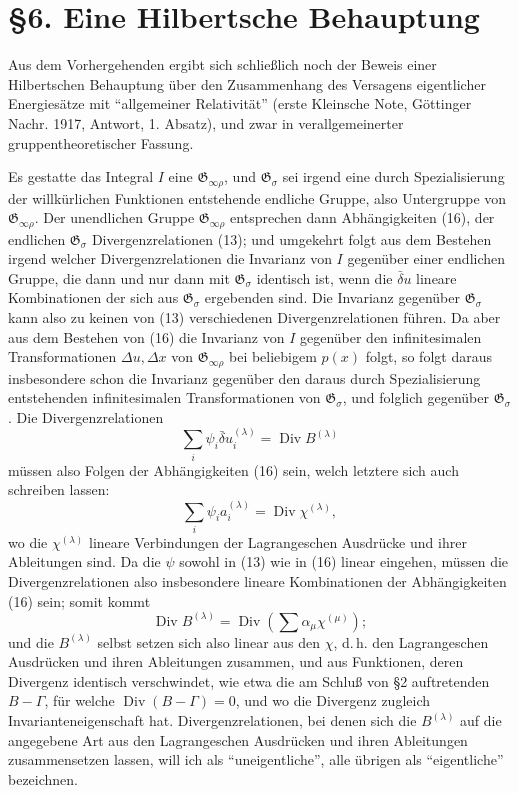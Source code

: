 \documentclass[11pt]{article}
\newcommand{\D}{\Delta}
\providecommand{\Div}{\operatorname{Div}}
\providecommand{\G}{\mathfrak G}
\providecommand{\bd}{\bar{\delta}}
\begin{document}
\section*{\S{}6. Eine Hilbertsche Behauptung}

Aus dem Vorhergehenden ergibt sich schließlich noch der Beweis einer Hilbertschen Behauptung über den Zusammenhang des Versagens eigentlicher Energiesätze mit ``allgemeiner Relativität'' (erste Kleinsche Note, Göttinger Nachr. 1917, Antwort, 1. Absatz), und zwar in verallgemeinerter gruppentheoretischer Fassung.

Es gestatte das Integral \(I\) eine \(\G_{\infty\rho}\), und \(\G_\sigma\) sei irgend eine durch Spezialisierung der willkürlichen Funktionen entstehende endliche Gruppe, also Untergruppe von \(\G_{\infty\rho}\). Der unendlichen Gruppe \(\G_{\infty\rho}\) entsprechen dann Abhängigkeiten (16), der endlichen \(\G_\sigma\) Divergenzrelationen (13); und umgekehrt folgt aus dem Bestehen irgend welcher Divergenzrelationen die Invarianz von \(I\) gegenüber einer endlichen Gruppe, die dann und nur dann mit \(\G_\sigma\) identisch ist, wenn die \(\bd u\) lineare Kombinationen der sich aus \(\G_\sigma\) ergebenden sind. Die Invarianz gegenüber \(\G_\sigma\) kann also zu keinen von (13) verschiedenen Divergenzrelationen führen. Da aber aus dem Bestehen von (16) die Invarianz von \(I\) gegenüber den infinitesimalen Transformationen \(\D u,\D x\) von \(\G_{\infty\rho}\) bei beliebigem \(p(x)\) folgt, so folgt daraus insbesondere schon die Invarianz gegenüber den daraus durch Spezialisierung entstehenden infinitesimalen Transformationen von \(\G_\sigma\), und folglich gegenüber \(\G_\sigma\). Die Divergenzrelationen
\[
\sum_i\psi_i\bd u_i^{(\lambda)}=\Div B^{(\lambda)}
\]
müssen also Folgen der Abhängigkeiten (16) sein, welch letztere sich auch schreiben lassen:
\[
\sum_i\psi_i a_i^{(\lambda)}=\Div\chi^{(\lambda)},
\]
wo die \(\chi^{(\lambda)}\) lineare Verbindungen der Lagrangeschen Ausdrücke und ihrer Ableitungen sind. Da die \(\psi\) sowohl in (13) wie in (16) linear eingehen, müssen die Divergenzrelationen also insbesondere lineare Kombinationen der Abhängigkeiten (16) sein; somit kommt
\[
\Div B^{(\lambda)}=\Div\left(\sum \alpha_\mu\chi^{(\mu)}\right);
\]
und die \(B^{(\lambda)}\) selbst setzen sich also linear aus den \(\chi\), d.\,h. den Lagrangeschen Ausdrücken und ihren Ableitungen zusammen, und aus Funktionen, deren Divergenz identisch verschwindet, wie etwa die am Schluß von \S{}2 auftretenden \(B-\Gamma\), für welche \(\Div(B-\Gamma)=0\), und wo die Divergenz zugleich Invarianteneigenschaft hat. Divergenzrelationen, bei denen sich die \(B^{(\lambda)}\) auf die angegebene Art aus den Lagrangeschen Ausdrücken und ihren Ableitungen zusammensetzen lassen, will ich als ``uneigentliche'', alle übrigen als ``eigentliche'' bezeichnen.
\end{document}
